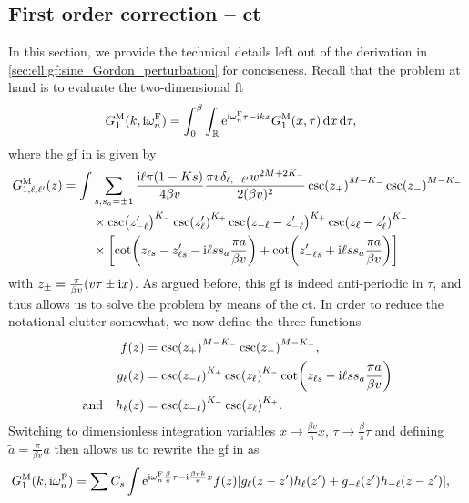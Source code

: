\subsection{First order correction -- \texorpdfstring{\acrlong{ct}}{CT}}\label{sec:app:convolution_theorem_first_order}
In this section, we provide the technical details left out of the derivation in \autoref{sec:ell:gf:sine_Gordon_perturbation} for conciseness.
Recall that the problem at hand is to evaluate the two-dimensional \gls{ft}
\begin{align*}
G^{\text{M}}_1(k,\text{i}\omega_n^{\text{F}}) &= \int_{0}^{\beta} \int_{\mathbb{R}} \text{e}^{\text{i}\omega_n^{\text{F}} \tau - \text{i} k x} G^{\text{M}}_1(x,\tau) \, \mathrm{d}x  \,\mathrm{d}\tau,
\end{align*}
where the \gls{gf} in \trspace{} is given by
\begin{align*}
G_{1,\ell,\ell'}^\M(z) = \int &\sum_{s,s_a=\pm 1} \frac{\i\ell\pi (1-Ks)}{4\beta v} \frac{\pi v \delta_{\ell,-\ell'} w^{2M+2K_-}}{2(\beta v)^2} \csc(z_+)^{M-K_-} \csc(z_-)^{M-K_-} \\
&\times \csc(z_{-\ell}')^{K_-} \csc(z_{\ell}')^{K_+}  \csc(z_{-\ell}-z_{-\ell}')^{K_+} \csc(z_{\ell}-z_{\ell}')^{K_-} \\
&\times \klb*{\cot\kla*{z_{\ell s}-z_{\ell s}' - \i \ell ss_a \frac{\pi a}{\beta v}} + \cot\kla*{z_{-\ell s}' + \i \ell ss_a\frac{\pi a}{\beta v}}}
\end{align*}
with $z_\pm = \frac{\pi}{\beta v} \kla*{v\tau \pm \i x}$.
As argued before, this \gls{gf} is indeed anti-periodic in $\tau$, and thus allows us to solve the problem by means of the \gls{ct}.
In order to reduce the notational clutter somewhat, we now define the three functions
\begin{align*}
f(z) &= \csc(z_+)^{M-K_-} \csc(z_-)^{M-K_-},\\
g_\ell(z) &= \csc(z_{-\ell})^{K_+} \csc(z_{\ell})^{K_-} \cot\kla*{z_{\ell s} - \i\ell ss_a \frac{\pi a}{\beta v}}\\
\text{and}\quad h_\ell(z) &= \csc(z_{-\ell})^{K_-} \csc(z_{\ell})^{K_+}.
\end{align*}
Switching to dimensionless integration variables $x\rightarrow \frac{\beta v}{\pi} x$, $\tau \rightarrow \frac{\beta}{\pi} \tau$ and defining $\tilde{a} = \frac{\pi}{\beta v}a$ then allows us to rewrite the \gls{gf} in \tpspace{} as
\begin{align*}
G_1^\M(k,\i\omega_n^\F) &= \sum C_{s} \int \powe{\i \omega_n^\F \frac{\beta}{\pi} \tau - \i \frac{\beta v k}{\pi} x} f(z) \klb*{g_\ell(z-z') h_\ell(z') + g_{-\ell}(z') h_{-\ell} (z-z')},
\end{align*}
